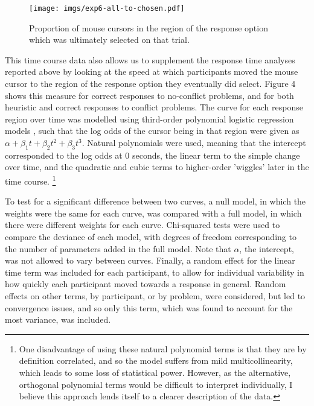 \begin{figure}[ht]
  \centering
  \texttt{[image: imgs/exp6-all-to-chosen.pdf]}
  \caption[Proportion of cursor in region of chosen response option, Experiment 6.]{
    \label{fig:exp6-all-to-chosen}
    Proportion of mouse cursors in the region of
    the response option which was ultimately selected on that trial.    
  }
\end{figure}

This time course data also allows us to
supplement the response time analyses reported above
by looking at the speed at which participants moved the mouse cursor to
the region of the response option they eventually did select.
Figure 4 shows this measure for correct responses to no-conflict problems,
and for both heuristic and correct responses to conflict problems.
The curve for each response region over time
was modelled using third-order polynomial logistic regression models
\citep[or growth curves; see][]{Mirman2014},
such that the log odds of the cursor being in that region were given as
$\alpha + \beta_1 t + \beta_2 t^2 + \beta_3 t^3$.
Natural polynomials were used,
meaning that the intercept corresponded to the log odds at 0 seconds,
the linear term to the simple change over time,
and the quadratic and cubic terms to higher-order 'wiggles' later in the time course.%
\footnote{
  One disadvantage of using these natural polynomial terms
  is that they are by definition correlated,
  and so the model suffers from mild multicollinearity,
  which leads to some loss of statistical power.
  However, as the alternative, orthogonal polynomial terms
  would be difficult to interpret individually,
  I believe this approach lends itself
  to a clearer description of the data.
  }

To test for a significant difference between two curves,
a null model, in which the  weights were the same for each curve,
was compared with a full model, in which there were different  weights for each curve.
Chi-squared tests were used to compare the deviance of each model,
with degrees of freedom corresponding to the number of  parameters added in the full model.
Note that $\alpha$, the intercept, was not allowed to vary between curves.
Finally, a random effect for the linear time term was included for each participant,
to allow for individual variability in
how quickly each participant moved towards a response in general.
Random effects on other terms, by participant, or by problem, were considered,
but led to convergence issues, and so only this term,
which was found to account for the most variance, was included.

